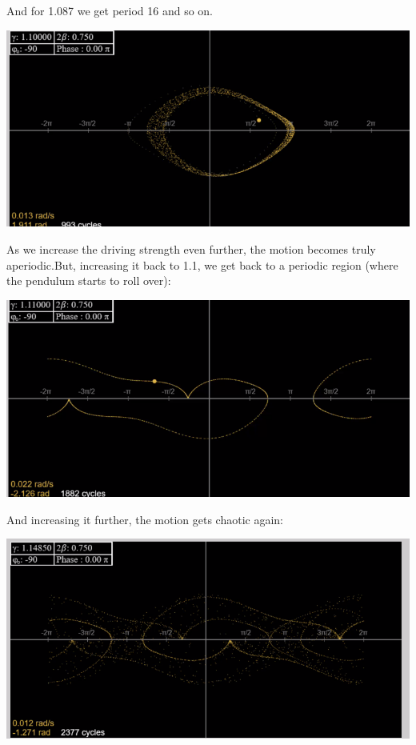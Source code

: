 \documentclass[../PHYS306Notes.tex]{subfiles}
\begin{document}
And for 1.087 we get period 16 and so on.
\begin{center}
    \includegraphics[scale=0.7]{Lecture-33/l33-img13.png}
\end{center}
As we increase the driving strength even further, the motion becomes truly aperiodic.But, increasing it back to 1.1, we get back to a periodic region (where the pendulum starts to roll over):
\begin{center}
    \includegraphics[scale=0.7]{Lecture-33/l33-img14.png}
\end{center}
And increasing it further, the motion gets chaotic again:
\begin{center}
    \includegraphics[scale=0.7]{Lecture-33/l33-img15.png}
\end{center}
\end{document}
